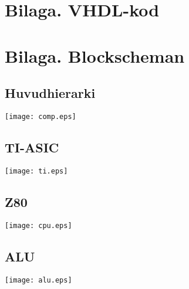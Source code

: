 \documentclass[main.tex]{subfiles}
\begin{document}
\appendix
\section{Bilaga. VHDL-kod}


\newpage
\recalctypearea
\vspace*{-10mm}
\section{Bilaga. Blockscheman}
\subsection{Huvudhierarki}
\begin{minipage}{\textwidth}
    \texttt{[image: comp.eps]}
\end{minipage}
\vspace*{-10mm}
\subsection{TI-ASIC}
\begin{minipage}{\textwidth}
    \texttt{[image: ti.eps]}
\end{minipage}
\vspace*{-10mm}
\subsection{Z80}
\begin{minipage}{\textwidth}
    \vspace{-2mm}
    \hspace{-15mm}
    \texttt{[image: cpu.eps]}
\end{minipage}
\vspace*{-10mm}
\subsection{ALU}
\begin{minipage}{\textwidth}
    \texttt{[image: alu.eps]}
\end{minipage}
\newpage
\recalctypearea
\end{document}
